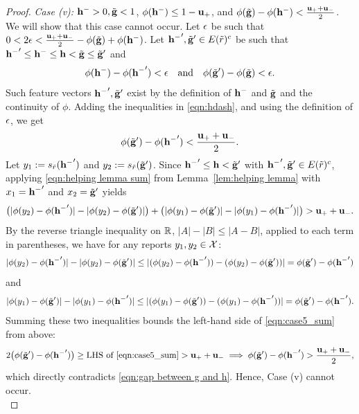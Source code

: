 \begin{proof}
\noindent \textit{Case (v): }{$\mathbf{h^{-}} > 0, \tilde{\mathbf{g}} < 1$, $\phi(\mathbf{h^{-}}) \le 1 - \mathbf{u_+}$, and $\phi(\tilde{\mathbf{g}}) - \phi(\mathbf{h^{-}}) < \frac{\mathbf{u_+} + \mathbf{u_-}}{2}$.}\\
We will show that this case cannot occur. Let $\epsilon$ be such that
	$0 < 2\epsilon < \frac{\mathbf{u_+} + \mathbf{u_-}}{2} -  \phi(\tilde{\mathbf{g}}) + \phi(\mathbf{h^{-}})$. Let
	$\mathbf{h^{-}}', \tilde{\mathbf{g}}' \in E(\tilde{r})^c$ be such that $\mathbf{h^{-}}' \leq \mathbf{h^{-}} \leq \mathbf{h} < \tilde{\mathbf{g}} \leq \tilde{\mathbf{g}}'$ and
	\begin{equation}\label{eqn:hdash}
		\phi(\mathbf{h^{-}}) - \phi(\mathbf{h^{-}}') < \epsilon \quad \text{and} \quad \phi(\tilde{\mathbf{g}}') - \phi(\tilde{\mathbf{g}}) < \epsilon.
	\end{equation}
	Such feature vectors $\mathbf{h^{-}}', \tilde{\mathbf{g}}'$ exist by the definition of $\mathbf{h^{-}}$ and $\tilde{\mathbf{g}}$ and the continuity of $\phi$. Adding the inequalities in \eqref{eqn:hdash}, and using the definition of $\epsilon$, we get
	\begin{equation}\label{eqn:gap between g and h}
		\phi(\tilde{\mathbf{g}}') - \phi(\mathbf{h^{-}}') < \frac{\mathbf{u_+} + \mathbf{u_-} }{2}.
	\end{equation}
	Let $y_1 := s_{\tilde{r}}(\mathbf{h^{-}}')$ and $y_2 := s_{\tilde{r}}(\tilde{\mathbf{g}}')$. Since $\mathbf{h^{-}}' \le \mathbf{h} < \tilde{\mathbf{g}}'$ with $\mathbf{h^{-}}', \tilde{\mathbf{g}}' \in E(\tilde{r})^c$, applying \eqref{eqn:helping lemma sum} from Lemma~\ref{lem:helping lemma} with $x_1 = \mathbf{h^{-}}'$ and $x_2 = \tilde{\mathbf{g}}'$ yields
	\begin{equation}\label{eqn:case5_sum}
	\big(|\phi(y_2) - \phi(\mathbf{h^{-}}')| - |\phi(y_2) - \phi(\tilde{\mathbf{g}}')|\big) + \big(|\phi(y_1) - \phi(\tilde{\mathbf{g}}')| - |\phi(y_1) - \phi(\mathbf{h^{-}}')|\big) > \mathbf{u_+} + \mathbf{u_-}.
	\end{equation}
	By the reverse triangle inequality on $\mathbb{R}$, $|A| - |B| \le |A - B|$, applied to each term in parentheses, we have for any reports $y_1, y_2 \in \mathcal{X}$:
	\[
	|\phi(y_2) - \phi(\mathbf{h^{-}}')| - |\phi(y_2) - \phi(\tilde{\mathbf{g}}')| \le |(\phi(y_2) - \phi(\mathbf{h^{-}}')) - (\phi(y_2) - \phi(\tilde{\mathbf{g}}'))| = \phi(\tilde{\mathbf{g}}') - \phi(\mathbf{h^{-}}')
	\]
	and
	\[
	|\phi(y_1) - \phi(\tilde{\mathbf{g}}')| - |\phi(y_1) - \phi(\mathbf{h^{-}}')| \le |(\phi(y_1) - \phi(\tilde{\mathbf{g}}')) - (\phi(y_1) - \phi(\mathbf{h^{-}}'))| = \phi(\tilde{\mathbf{g}}') - \phi(\mathbf{h^{-}}').
	\]
	Summing these two inequalities bounds the left-hand side of \eqref{eqn:case5_sum} from above:
	\[
	2\big(\phi(\tilde{\mathbf{g}}') - \phi(\mathbf{h^{-}}')\big) \ge \text{LHS of \eqref{eqn:case5_sum}} > \mathbf{u_+} + \mathbf{u_-} \implies \phi(\tilde{\mathbf{g}}') - \phi(\mathbf{h^{-}}') > \frac{\mathbf{u_+} + \mathbf{u_-}}{2},
	\]
	which directly contradicts \eqref{eqn:gap between g and h}. Hence, Case (v) cannot occur.\\


\end{proof}
